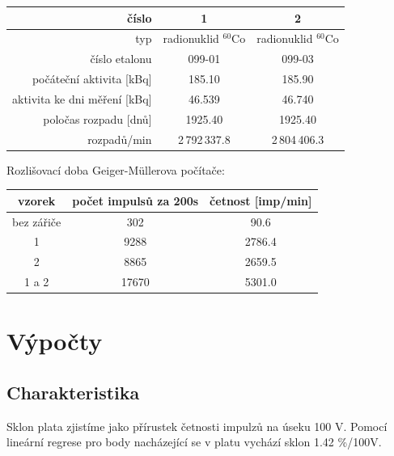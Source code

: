 \documentclass[10pt]{article}
\begin{document}
\begin{center}
\begin{tabular}{|r|c|c|}
\hline
číslo & 1 & 2 \\
\hline
typ   & radionuklid $^{60}$Co & radionuklid $^{60}$Co \\
číslo etalonu & 099-01 & 099-03 \\
počáteční aktivita [kBq] & 185.10 & 185.90 \\
aktivita ke dni měření [kBq] & 46.539 & 46.740 \\
poločas rozpadu [dnů] & 1925.40 & 1925.40 \\
rozpadů/min & 2\,792\,337.8 & 2\,804\,406.3 \\
\hline
\end{tabular}
\end{center}

\vspace{.5cm}
\noindent
Rozlišovací doba Geiger-M\"ullerova počítače:

\begin{center}
\begin{tabular}{|c|c|c|}
\hline
vzorek & počet impulsů za 200s & četnost [imp/min] \\
\hline
bez zářiče & 302 & 90.6 \\
1      & 9288  & 2786.4 \\
2      & 8865  & 2659.5 \\
1 a 2  & 17670 & 5301.0 \\
\hline
\end{tabular}
\end{center}


\section{Výpočty}
\subsection{Charakteristika}
Sklon plata zjistíme jako přírustek četnosti impulzů na úseku 100 V.  Pomocí
lineární regrese pro body nacházející se v platu vychází sklon 1.42 \%/100V.
\end{document}
